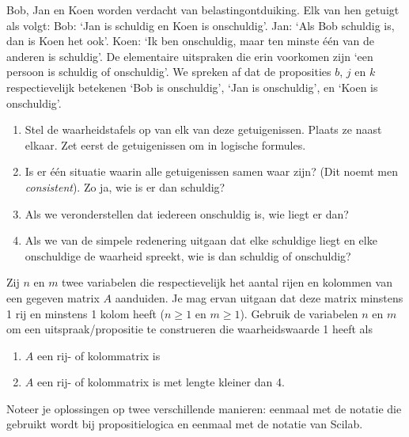 \begin{oef}
Bob, Jan en Koen worden verdacht van belastingontduiking. Elk van hen getuigt als volgt:
Bob: `Jan is schuldig en Koen is onschuldig'.
Jan: `Als Bob schuldig is, dan is Koen het ook'.
Koen: `Ik ben onschuldig, maar ten minste \'{e}\'{e}n van de anderen is schuldig'.
De elementaire uitspraken die erin voorkomen zijn `een persoon is schuldig of onschuldig'. We spreken af dat de proposities $b$, $j$ en $k$ respectievelijk betekenen `Bob is onschuldig', `Jan is onschuldig', en `Koen is onschuldig'.
\begin{enumerate}
\item Stel de waarheidstafels op van elk van deze getuigenissen. Plaats ze naast elkaar. Zet eerst de getuigenissen om in logische formules.
\item Is er \'{e}\'{e}n situatie waarin alle getuigenissen samen waar zijn? (Dit noemt men \emph{consistent}). Zo ja, wie is er dan schuldig?
\item Als we veronderstellen dat iedereen onschuldig is, wie liegt er dan?
\item Als we van de simpele redenering uitgaan dat elke schuldige liegt en elke onschuldige de waarheid spreekt, wie is dan schuldig of onschuldig?
\end{enumerate}

\end{oef}

\begin{oef}
 Zij $n$ en $m$ twee variabelen die respectievelijk het aantal rijen en kolommen van een gegeven matrix $A$ aanduiden. Je mag ervan uitgaan dat deze matrix minstens 1 rij en minstens 1 kolom heeft ($n \geqslant 1$ en $m\geqslant 1$). Gebruik de variabelen $n$ en $m$ om een uitspraak/propositie te construeren die waarheidswaarde 1 heeft als

\begin{enumerate}
\item $A$ een rij- of kolommatrix is
\item  $A$ een rij- of kolommatrix is met lengte kleiner dan 4.
\end{enumerate}
Noteer je oplossingen op twee verschillende manieren: eenmaal met de notatie die gebruikt wordt bij propositielogica en eenmaal met de notatie van Scilab.

\end{oef}

